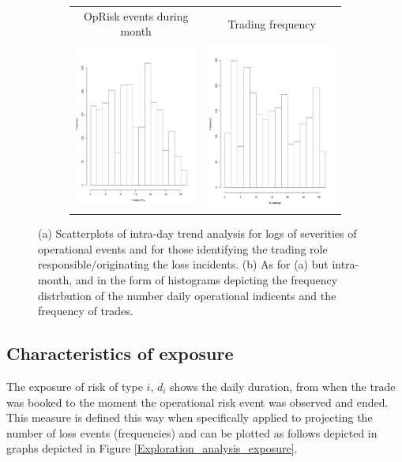 \documentclass{DissertateUSU}
\begin{document}
\begin{figure}
\begin{subfigure}[b]{0.55\textwidth}
   \begin{frame}
      \centering
       \begin{tabular}{cc}
        OpRisk events during month & Trading frequency \\
        \includegraphics[height=5.5cm, width=7.5cm]{UpdatedDayFreq.pdf}
         &
         \includegraphics[height=5.5cm, width=7.5cm]{TradedDayFreq.pdf}
         \end{tabular}
    \end{frame}
   \label{Hist_Loss_Freq}
\end{subfigure}
\caption[Numerical grid display]{(a) Scatterplots of intra-day trend analysis for logs of severities of operational events and for those identifying the trading role responsible/originating the loss incidents. (b) As for (a) but intra-month, and in the form of histograms depicting the frequency distrbution of the number daily operational indicents and the frequency of trades.} 
\end{figure}

\subsection{Characteristics of exposure}

The exposure of risk of type \(i\), \(d_i\) shows the daily duration,
from when the trade was booked to the moment the operational risk event
was observed and ended. This measure is defined this way when
specifically applied to projecting the number of loss events
(frequencies) and can be plotted as follows depicted in graphs depicted
in Figure \ref{Exploration_analysis_exposure}.\medskip
\end{document}
